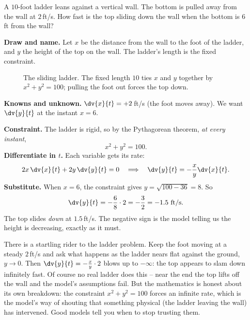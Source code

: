 \begin{example}
\label{ch13:ex-ladder}
A $10$-foot ladder leans against a vertical wall. The bottom is pulled away from the wall at
$2$\,ft/s. How fast is the top sliding down the wall when the bottom is $6$\,ft from the wall?

\textbf{Draw and name.} Let $x$ be the distance from the wall to the foot of the ladder, and $y$ the
height of the top on the wall. The ladder's length is the fixed constraint.

\begin{figure}[H]
\centering
{}
\caption{The sliding ladder. The fixed length $10$ ties $x$ and $y$ together by
$x^2+y^2=100$; pulling the foot out forces the top down.}
\label{ch13:fig-ladder}
\end{figure}

\textbf{Knowns and unknown.} $\dv{x}{t} = +2$\,ft/s (the foot moves away). We want $\dv{y}{t}$ at the
instant $x=6$.

\textbf{Constraint.} The ladder is rigid, so by the Pythagorean theorem, \emph{at every instant},
\[
x^2 + y^2 = 100.
\]
\textbf{Differentiate in $t$.} Each variable gets its rate:
\[
2x\,\dv{x}{t} + 2y\,\dv{y}{t} = 0
\quad\Longrightarrow\quad
\dv{y}{t} = -\frac{x}{y}\dv{x}{t}.
\]
\textbf{Substitute.} When $x=6$, the constraint gives $y = \sqrt{100-36} = 8$. So
\[
\dv{y}{t} = -\frac{6}{8}\cdot 2 = -\frac{3}{2} = -1.5\ \text{ft/s}.
\]
The top slides \emph{down} at $1.5$\,ft/s. The negative sign is the model telling us the height is
decreasing, exactly as it must.
\end{example}

\begin{aestheticbox}
There is a startling rider to the ladder problem. Keep the foot moving at a steady $2$\,ft/s and ask
what happens as the ladder nears flat against the ground, $y\to 0$. Then $\dv{y}{t} = -\tfrac{x}{y}
\cdot 2$ blows up to $-\infty$: the top appears to slam down infinitely fast. Of course no real
ladder does this -- near the end the top lifts off the wall and the model's assumptions fail. But the
mathematics is honest about its own breakdown: the constraint $x^2+y^2=100$ forces an infinite rate,
which is the model's way of shouting that something physical (the ladder leaving the wall) has
intervened. Good models tell you when to stop trusting them.
\end{aestheticbox}

